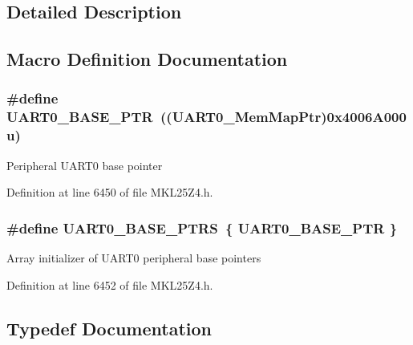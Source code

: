 \subsection{Detailed Description}


\subsection{Macro Definition Documentation}
\subsubsection[{\texorpdfstring{U\+A\+R\+T0\+\_\+\+B\+A\+S\+E\+\_\+\+P\+TR}{UART0_BASE_PTR}}]{\setlength{\rightskip}{0pt plus 5cm}\#define U\+A\+R\+T0\+\_\+\+B\+A\+S\+E\+\_\+\+P\+TR~(({\bf U\+A\+R\+T0\+\_\+\+Mem\+Map\+Ptr})0x4006\+A000u)}\hypertarget{group___u_a_r_t0___peripheral_ga50a02c91ffbd11fa7b4f0c33fe585199}{}\label{group___u_a_r_t0___peripheral_ga50a02c91ffbd11fa7b4f0c33fe585199}
Peripheral U\+A\+R\+T0 base pointer 

Definition at line 6450 of file M\+K\+L25\+Z4.\+h.

\subsubsection[{\texorpdfstring{U\+A\+R\+T0\+\_\+\+B\+A\+S\+E\+\_\+\+P\+T\+RS}{UART0_BASE_PTRS}}]{\setlength{\rightskip}{0pt plus 5cm}\#define U\+A\+R\+T0\+\_\+\+B\+A\+S\+E\+\_\+\+P\+T\+RS~\{ {\bf U\+A\+R\+T0\+\_\+\+B\+A\+S\+E\+\_\+\+P\+TR} \}}\hypertarget{group___u_a_r_t0___peripheral_ga9416d89d2bc04eb37311da5910f1c701}{}\label{group___u_a_r_t0___peripheral_ga9416d89d2bc04eb37311da5910f1c701}
Array initializer of U\+A\+R\+T0 peripheral base pointers 

Definition at line 6452 of file M\+K\+L25\+Z4.\+h.



\subsection{Typedef Documentation}
